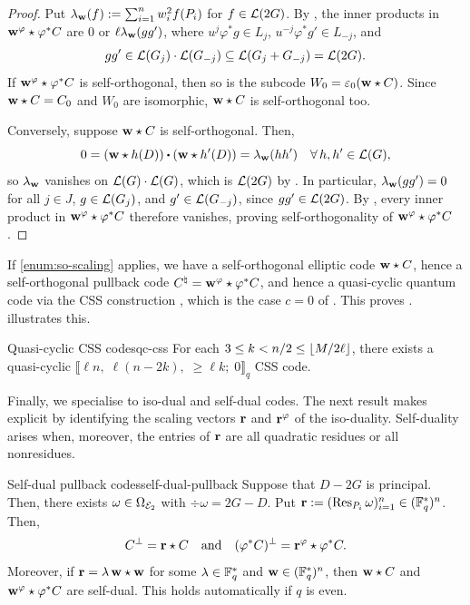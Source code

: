 \documentclass[twocolumn, 11pt]{scrartcl}
\begin{document}
\begin{proof}
    Put $\lambda_\mathbf{w}(f):=\sum_{i=1}^nw_i^2f(P_i)$ for $f\in\mathcal{L}(2G)$. By , the inner products in $\mathbf{w}^\varphi\star \varphi^*C$ are $0$ or $\ell\lambda_\mathbf{w}(gg')$, where $u^j\varphi^*g\in L_j$, $u^{-j}\varphi^*g'\in L_{-j}$, and
    \[ gg'\in\mathcal{L}(G_j)\cdot\mathcal{L}(G_{-j})\subseteq\mathcal{L}(G_j+G_{-j})=\mathcal{L}(2G). \]
    If $\mathbf{w}^\varphi\star \varphi^*C$ is self-orthogonal, then so is the subcode $W_0=\varepsilon_0(\mathbf{w}\star C)$. Since $\mathbf{w}\star C=C_0$ and $W_0$ are isomorphic, $\mathbf{w}\star C$ is self-orthogonal too. 
    
    Conversely, suppose $\mathbf{w}\star C$ is self-orthogonal. Then,
    \[ 0=(\bfw\star h(D))\dotpr(\bfw\star h'(D))=\lambda_\bfw(hh') \quad\forall h,h'\in\mcL(G),\]
    so $\lambda_\mathbf{w}$ vanishes on $\mathcal{L}(G)\cdot\mathcal{L}(G)$, which is $\mathcal{L}(2G)$ by \cite[Thm.~6]{mumford1970varieties}. In particular, $\lambda_\mathbf{w}(gg')=0$ for all $j\in J$, $g\in\mathcal{L}(G_j)$, and $g'\in\mathcal{L}(G_{-j})$, since $gg'\in\mathcal{L}(2G)$. By , every inner product in $\mathbf{w}^\varphi\star\varphi^*C$ therefore vanishes, proving self-orthogonality of $\mathbf{w}^\varphi\star \varphi^*C$.
\end{proof}

If \ref{enum:so-scaling} applies, we have a self-orthogonal elliptic code $\mathbf{w}\star C$, hence a self-orthogonal pullback code $C^\natural=\mathbf{w}^\varphi\star \varphi^*C$, and hence a quasi-cyclic quantum code via the CSS construction \cite{ketkar2006nonbinary}, which is the case $c=0$ of . This proves .  illustrates this.

\begin{corollary}{Quasi-cyclic CSS codes}{qc-css}
    For each $3\leq k<n/2\leq\lfloor M/2\ell\rfloor$, there exists a quasi-cyclic $\llbracket \ell n,\;\ell(n-2k),\;\geq\ell k;\;0\rrbracket_q$ CSS code.
\end{corollary}

Finally, we specialise to iso-dual and self-dual codes. The next result makes  explicit by identifying the scaling vectors $\mathbf{r}$ and $\mathbf{r}^\varphi$ of the iso-duality. Self-duality arises when, moreover, the entries of $\mathbf{r}$ are all quadratic residues or all nonresidues.

\begin{proposition}{Self-dual pullback codes}{self-dual-pullback}
    Suppose that $D-2G$ is principal. Then, there exists $\omega\in\Omega_{\mathcal{E}_2}$ with $\div\omega=2G-D$. Put $\mathbf{r}:=(\operatorname{Res}_{P_i}\omega)_{i=1}^n\in(\mathbb{F}_q^*)^n$. Then,
    \[ C^\perp=\mathbf{r}\star C\quad\text{and}\quad (\varphi^*C)^\perp=\mathbf{r}^\varphi\star \varphi^*C. \]
    Moreover, if $\mathbf{r}=\lambda\,\mathbf{w}\star\mathbf{w}$ for some $\lambda\in\mathbb{F}_q^*$ and $\mathbf{w}\in(\mathbb{F}_q^*)^n$, then $\mathbf{w}\star C$ and $\mathbf{w}^\varphi\star \varphi^*C$ are self-dual. This holds automatically if $q$ is even.
\end{proposition}
\end{document}
